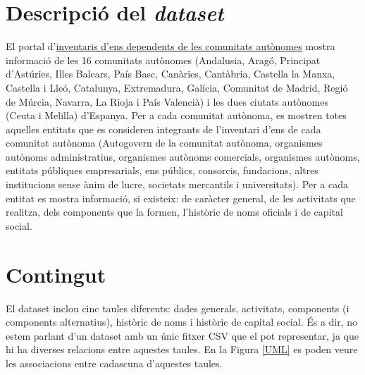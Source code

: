 \documentclass[12pt]{article}
\begin{document}
\section*{Descripció del \textit{dataset}}
El portal d'\href{https://serviciostelematicosext.hacienda.gob.es/SGCIEF/PubInvCCAA/secciones/FrmSelComunidad.aspx}{inventaris d'ens dependents de les comunitats autònomes} mostra informació de les 16 comunitats autònomes (Andalusia, Aragó, Principat d'Astúries, Illes Balears, País Basc, Canàries, Cantàbria, Castella la Manxa, Castella i Lleó, Catalunya, Extremadura, Galícia, Comunitat de Madrid, Regió de Múrcia, Navarra, La Rioja i País Valencià) i les dues ciutats autònomes (Ceuta i Melilla) d'Espanya. Per a cada comunitat autònoma, es mostren totes aquelles entitats que es consideren integrants de l'inventari d'ens de cada comunitat autònoma (Autogovern de la comunitat autònoma, organismes autònoms administratius, organismes autònoms comercials, organismes autònoms, entitats públiques empresarials, ens públics, consorcis, fundacions, altres institucions sense ànim de lucre, societats mercantils i universitats). Per a cada entitat es mostra informació, si existeix: de caràcter general, de les activitats que realitza, dels components que la formen, l'històric de noms oficials i de capital social.\par

\section*{Contingut}

El dataset inclou cinc taules diferents: dades generals, activitats, components (i components alternatius), històric de noms i històric de capital social. És a dir, no estem parlant d'un dataset amb un únic fitxer CSV que el pot representar, ja que hi ha diverses relacions entre aquestes taules. En la Figura \ref{UML} es poden veure les associacions entre cadascuna d'aquestes taules.
\end{document}
